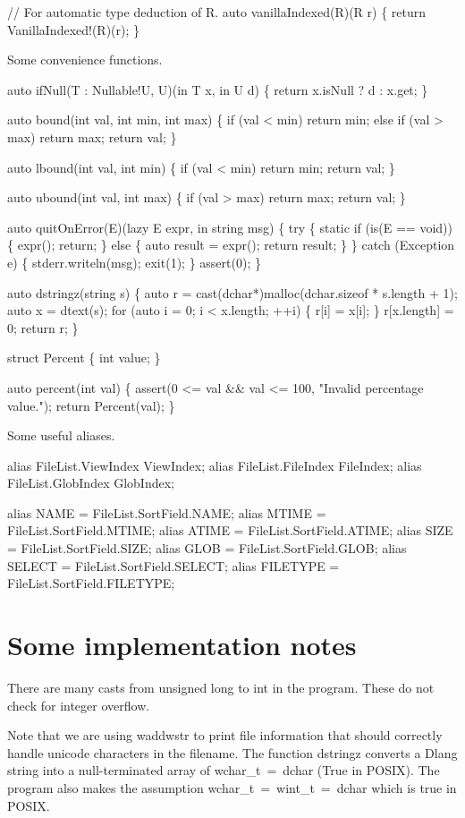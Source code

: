 // For automatic type deduction of R.
auto vanillaIndexed(R)(R r)
\{
  return VanillaIndexed!(R)(r);
\}

\nwendcode{}Some convenience functions.

\nwenddocs{}\endmoddef\nwstartdeflinemarkup\nwenddeflinemarkup
auto ifNull(T : Nullable!U, U)(in T x, in U d)
\{
  return x.isNull ? d : x.get;
\}

auto bound(int val, int min, int max)
\{
  if (val < min) return min;
  else if (val > max) return max;
  return val;
\}

auto lbound(int val, int min)
\{
  if (val < min) return min;
  return val;
\}

auto ubound(int val, int max)
\{
  if (val > max) return max;
  return val;
\}

auto quitOnError(E)(lazy E expr, in string msg)
\{
  try \{
    static if (is(E == void)) \{
      expr();
      return;
    \} else \{
      auto result = expr();
      return result;
    \}
  \} catch (Exception e) \{
    stderr.writeln(msg);
    exit(1);
  \}
  assert(0);
\}

auto dstringz(string s)
\{
  auto r = cast(dchar*)malloc(dchar.sizeof * s.length + 1);
  auto x = dtext(s);
  for (auto i = 0; i < x.length; ++i) \{
    r[i] = x[i];
  \}
  r[x.length] = 0;
  return r;
\}

struct Percent
\{
  int value;
\}

auto percent(int val)
\{
  assert(0 <= val && val <= 100,
         "Invalid percentage value.");
  return Percent(val);
\}

\nwendcode{}Some useful aliases.

\nwenddocs{}\endmoddef\nwstartdeflinemarkup\nwenddeflinemarkup
alias FileList.ViewIndex ViewIndex;
alias FileList.FileIndex FileIndex;
alias FileList.GlobIndex GlobIndex;

alias NAME     = FileList.SortField.NAME;
alias MTIME    = FileList.SortField.MTIME;
alias ATIME    = FileList.SortField.ATIME;
alias SIZE     = FileList.SortField.SIZE;
alias GLOB     = FileList.SortField.GLOB;
alias SELECT   = FileList.SortField.SELECT;
alias FILETYPE = FileList.SortField.FILETYPE;

\nwendcode{}\section*{Some implementation notes} There are many casts from
unsigned long to int in the program. These do not check for integer
overflow.

Note that we are using {\Tt{}waddwstr\nwendquote} to print file information that
should correctly handle unicode characters in the filename. The
function {\Tt{}dstringz\nwendquote} converts a Dlang {\Tt{}string\nwendquote} into a
null-terminated array of {\Tt{}wchar{\_}t\ =\ dchar\nwendquote} (True in POSIX). The
program also makes the assumption {\Tt{}wchar{\_}t\ =\ wint{\_}t\ =\ dchar\nwendquote} which
is true in POSIX.
\nwenddocs{}
